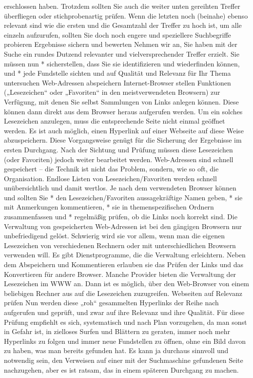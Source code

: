 \documentclass[]{book}
\theoremstyle{definition}
\theoremstyle{definition}
\theoremstyle{definition}
\theoremstyle{remark}
\begin{document}
erschlossen haben. Trotzdem sollten Sie auch die weiter unten gereihten
Treffer überfliegen oder stichprobenartig prüfen. Wenn die letzten noch
(beinahe) ebenso relevant sind wie die ersten und die Gesamtzahl der
Treffer zu hoch ist, um alle einzeln aufzurufen, sollten Sie doch noch
engere und speziellere Suchbegriffe probieren Ergebnisse sichern und
bewerten Nehmen wir an, Sie haben mit der Suche ein rundes Dutzend
relevanter und vielversprechender Treffer erzielt. Sie müssen nun *
sicherstellen, dass Sie sie identifizieren und wiederfinden können, und
* jede Fundstelle sichten und auf Qualität und Relevanz für Ihr Thema
untersuchen Web-Adressen abspeichern Internet-Browser stellen Funktionen
(„Lesezeichen`` oder „Favoriten`` in den meistverwendeten Browsern) zur
Verfügung, mit denen Sie selbst Sammlungen von Links anlegen können.
Diese können dann direkt aus dem Browser heraus aufgerufen werden. Um
ein solches Lesezeichen anzulegen, muss die entsprechende Seite nicht
einmal geöffnet werden. Es ist auch möglich, einen Hyperlink auf einer
Webseite auf diese Weise abzuspeichern. Diese Vorgangsweise genügt für
die Sicherung der Ergebnisse im ersten Durchgang. Nach der Sichtung und
Prüfung müssen diese Lesezeichen (oder Favoriten) jedoch weiter
bearbeitet werden. Web-Adressen sind schnell gespeichert -- die Technik
ist nicht das Problem, sondern, wie so oft, die Organisation. Endlose
Listen von Lesezeichen/Favoriten werden schnell unübersichtlich und
damit wertlos. Je nach dem verwendeten Browser können und sollten Sie *
den Lesezeichen/Favoriten aussagekräftige Namen geben, * sie mit
Anmerkungen kommentieren, * sie in themenspezifischen Ordnern
zusammenfassen und * regelmäßig prüfen, ob die Links noch korrekt sind.
Die Verwaltung von gespeicherten Web-Adressen ist bei den gängigen
Browsern nur unbefriedigend gelöst. Schwierig wird sie vor allem, wenn
man die eigenen Lesezeichen von verschiedenen Rechnern oder mit
unterschiedlichen Browsern verwenden will. Es gibt Dienstprogramme, die
die Verwaltung erleichtern. Neben dem Abspeichern und Kommentieren
erlauben sie das Prüfen der Links und das Konvertieren für andere
Browser. Manche Provider bieten die Verwaltung der Lesezeichen im WWW
an. Dann ist es möglich, über den Web-Browser von einem beliebigen
Rechner aus auf die Lesezeichen zuzugreifen. Webseiten auf Relevanz
prüfen Nun werden diese „roh`` gesammelten Hyperlinks der Reihe nach
aufgerufen und geprüft, und zwar auf ihre Relevanz und ihre Qualität.
Für diese Prüfung empfiehlt es sich, systematisch und nach Plan
vorzugehen, da man sonst in Gefahr ist, in zielloses Surfen und Blättern
zu geraten, immer noch mehr Hyperlinks zu folgen und immer neue
Fundstellen zu öffnen, ohne ein Bild davon zu haben, was man bereits
gefunden hat. Es kann ja durchaus sinnvoll und notwendig sein, den
Verweisen auf einer mit der Suchmaschine gefundenen Seite nachzugehen,
aber es ist ratsam, das in einem späteren Durchgang zu machen.
\end{document}

